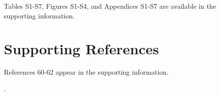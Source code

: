 \documentclass[12pt]{article}
\begin{document}
Tables S1-S7, Figures S1-S4, and Appendices S1-S7 are available in the supporting information.  

\section*{Supporting References}

References 60-62 appear in the supporting information.

\nocite{chodera2012}
\nocite{crooks2007beyond}
\nocite{chodera2012}
\nocite{jaynes1957information}
\nocite{rozycki2011saxs}.  
\nocite{relative_entropy_wiki}
\nocite{rubin1981}
\nocite{flyvbjerg1989error}
\nocite{shirts2008}


\clearpage

\begin{table}

\small


\end{table}
\end{document}
